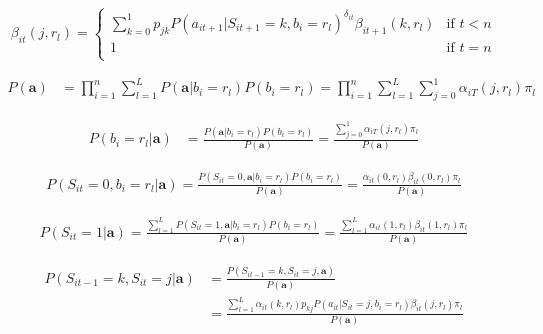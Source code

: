 \documentclass{article}
\begin{document}
\begin{equation} \label{bkwd}
\beta_{it}(j,r_l) = \begin{cases} 
    \sum_{k=0}^1p_{jk}P(a_{it+1}|S_{it+1}=k,b_i=r_l)^{\delta_{it}}\beta_{it+1}(k,r_l) 
        & \text{if } t < n \\
    1 & \text{if } t = n \\
\end{cases}
\end{equation}


\begin{equation}\label{proba}
\begin{split}
    P(\textbf{a}) & = \prod_{i=1}^n \sum_{l=1}^L 
        P(\textbf{a}|b_{i}=r_l)P(b_{i}=r_l) = 
    \prod_{i=1}^n \sum_{l=1}^L \sum_{j=0}^1 \alpha_{iT}(j,r_l)\pi_l 
\end{split}
\end{equation}

\begin{equation}\label{probl}
\begin{split}
    P(b_{i}=r_l|\textbf{a}) & = \frac{P(\textbf{a}|b_{i}=r_l)P(b_{i}=r_l)}{P(\textbf{a})} = 
    \frac{\sum_{j=0}^1 \alpha_{iT}(j,r_l)\pi_l }{P(\textbf{a})}  
\end{split}
\end{equation}

\begin{equation}\label{probs0}
\begin{split}
    P(S_{it}=0,b_{i}=r_l|\textbf{a}) = \frac{P(S_{it}=0,\textbf{a}|b_{i}=r_l)
        P(b_{i}=r_l)}{P(\textbf{a})} = 
    \frac{\alpha_{it}(0,r_l)\beta_{it}(0,r_l)\pi_l }{P(\textbf{a})} 
\end{split}
\end{equation}

\begin{equation}\label{probs1}
\begin{split}
    P(S_{it}=1|\textbf{a}) = 
    \frac{\sum^L_{l=1}P(S_{it}=1,\textbf{a}|b_{i}=r_l)
        P(b_{i}=r_l)}{P(\textbf{a})} = 
    \frac{\sum^L_{l=1}\alpha_{it}(1,r_l)\beta_{it}(1,r_l)\pi_l }{P(\textbf{a})} 
\end{split}
\end{equation}


\begin{equation}\label{probstran}
\begin{split}
    P(S_{it-1}=k,S_{it}=j|\textbf{a}) & = 
        \frac{P(S_{it-1}=k,S_{it}=j,\textbf{a})}{P(\textbf{a})} \\
    & = \frac{\sum^L_{l=1}\alpha_{it}(k,r_l) p_{kj} P(a_{it}|S_{it}=j, b_i=r_l)
        \beta_{it}(j,r_l)\pi_l }{P(\textbf{a})} 
\end{split}
\end{equation}
\end{document}
